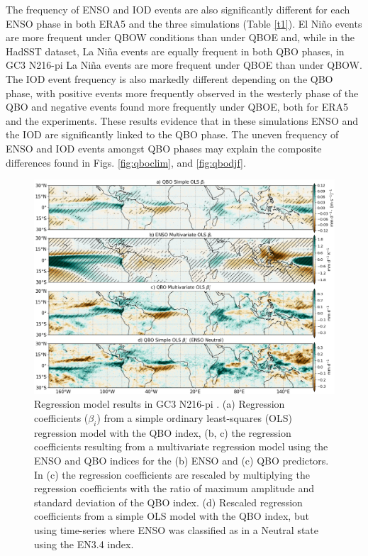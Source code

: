 The frequency of ENSO and IOD events are also significantly different for each ENSO phase in both ERA5 and the three simulations (Table \ref{t1}).
El Niño events are more frequent under QBOW conditions than under QBOE and, while in the HadSST dataset, La Niña events are equally frequent in both QBO phases, in GC3 N216-pi La Niña events are more frequent under QBOE than under QBOW. 
The IOD event frequency is also markedly different depending on the QBO phase, with positive events more frequently observed in the westerly phase of the QBO and negative  events found more frequently under QBOE, both for ERA5 and the experiments.
These results evidence that in these simulations ENSO and the IOD are significantly linked to the QBO phase. The uneven frequency of ENSO and IOD events amongst QBO phases may explain the composite differences found in Figs. \ref{fig:qboclim}, and \ref{fig:qbodjf}.

 \begin{figure}[t!]
\centering
 \noindent
 \includegraphics[width=\linewidth]{figures/regress_n216.png}
\caption[Convective precipitation regression analysis]{Regression model results in GC3 N216-pi . (a) Regression coefficients ($\beta_i$) from a simple ordinary least-squares (OLS) regression model with the QBO index, (b, c) the regression coefficients resulting from a multivariate regression model using the ENSO and QBO indices for the (b) ENSO and (c) QBO predictors. In (c) the regression coefficients are rescaled by multiplying the regression coefficients with the ratio of maximum amplitude and standard deviation of the QBO index. (d) Rescaled regression coefficients from a simple OLS model with the QBO index, but using time-series where ENSO was classified as in a Neutral state using the EN3.4 index.  }
\label{fig:enso_regress}
\end{figure}

